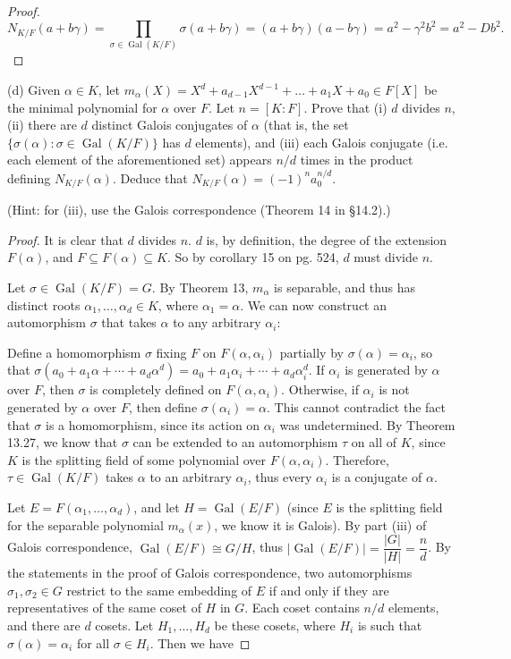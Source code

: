 \documentclass[10pt]{article}
\DeclareMathOperator*{\Gal}{Gal}
\begin{document}
\begin{enumerate}
\begin{proof}
$$
N_{K/F}(a + b\gamma) = \prod_{\sigma \in \Gal (K/F)} \sigma(a + b\gamma) = (a+b\gamma)(a-b\gamma) = a^2 - \gamma^2b^2 = a^2 - Db^2.
$$

\end{proof}

(d) Given $\alpha \in K$, let $m_\alpha (X) = X^d + a_{d-1}X^{d-1} + \ldots + a_1 X + a_0 \in F[X]$ be the minimal polynomial for $\alpha$ over $F$.  Let $n=[K:F]$.  Prove that (i) $d$ divides $n$, (ii) there are $d$ distinct Galois conjugates of $\alpha$ (that is, the set $\{\sigma(\alpha): \sigma \in \Gal(K/F)\}$ has $d$ elements), and (iii) each Galois conjugate (i.e. each element of the aforementioned set) appears $n/d$ times in the product defining $N_{K/F}(\alpha)$.  Deduce that $N_{K/F}(\alpha) = (-1)^n a_0^{n/d}$.

(Hint: for (iii), use the Galois correspondence (Theorem 14 in \S 14.2).)

\begin{proof}

It is clear that $d$ divides $n$.  $d$ is, by definition, the degree of the extension $F(\alpha)$, and $F \subseteq F(\alpha) \subseteq K$.  So by corollary 15 on pg. 524, $d$ must divide $n$.

Let $\sigma \in \Gal(K/F) = G$.  By Theorem 13, $m_{\alpha}$ is separable, and thus has distinct roots $\alpha_1, \dots , \alpha_d \in K$, where $\alpha_1 = \alpha$.  We can now construct an automorphism $\sigma$ that takes $\alpha$ to any arbitrary $\alpha_i$:

Define a homomorphism $\sigma$ fixing $F$ on $F(\alpha,\alpha_i)$ partially by $\sigma(\alpha) = \alpha_i$, so that $\sigma(a_0 + a_1 \alpha + \cdots + a_d \alpha^d) = a_0 + a_1 \alpha_i + \cdots + a_d \alpha_i^d$.  If $\alpha_i$ is generated by $\alpha$ over $F$, then $\sigma$ is completely defined on $F(\alpha,\alpha_i)$.  Otherwise, if $\alpha_i$ is not generated by $\alpha$ over $F$, then define $\sigma(\alpha_i) = \alpha$.  This cannot contradict the fact that $\sigma$ is a homomorphism, since its action on $\alpha_i$ was undetermined.  By Theorem 13.27, we know that $\sigma$ can be extended to an automorphism $\tau$ on all of $K$, since $K$ is the splitting field of some polynomial over $F(\alpha,\alpha_i)$.  Therefore, $\tau \in \Gal(K/F)$ takes $\alpha$ to an arbitrary $\alpha_i$, thus every $\alpha_i$ is a conjugate of $\alpha$.

Let $E = F(\alpha_1, \dots , \alpha_d)$, and let $H = \Gal(E/F)$ (since $E$ is the splitting field for the separable polynomial $m_{\alpha}(x)$, we know it is Galois).  By part (iii) of Galois correspondence, $\Gal(E/F) \cong G/H$, thus $|\Gal(E/F)| = \dfrac{|G|}{|H|} = \dfrac{n}{d}$.  By the statements in the proof of Galois correspondence, two automorphisms $\sigma_1, \sigma_2 \in G$ restrict to the same embedding of $E$ if and only if they are representatives of the same coset of $H$ in $G$.  Each coset contains $n/d$ elements, and there are $d$ cosets.  Let $H_1, \dots , H_d$ be these cosets, where $H_i$ is such that $\sigma(\alpha) = \alpha_i$ for all $\sigma \in H_i$.  Then we have


\end{proof}
\end{enumerate}
\end{document}
